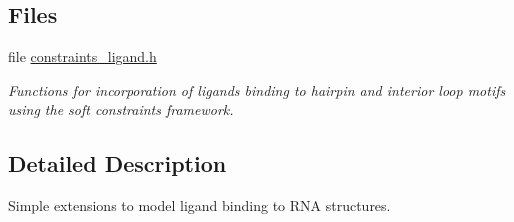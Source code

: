 \subsection*{Files}
\begin{DoxyCompactItemize}
\item 
file \hyperlink{constraints__ligand_8h}{constraints\+\_\+ligand.\+h}
\begin{DoxyCompactList}\small\item\em Functions for incorporation of ligands binding to hairpin and interior loop motifs using the soft constraints framework. \end{DoxyCompactList}\end{DoxyCompactItemize}


\subsection{Detailed Description}
Simple extensions to model ligand binding to R\+NA structures. 

